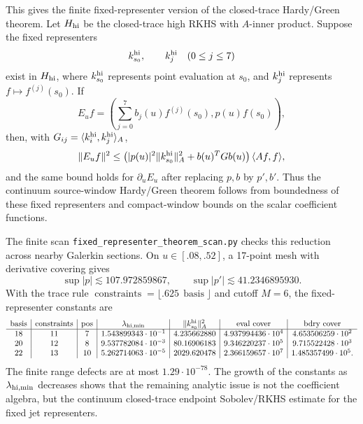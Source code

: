 \documentclass[11pt]{article}
\begin{document}
This gives the finite fixed-representer version of the closed-trace
Hardy/Green theorem.  Let \(H_{\rm hi}\) be the closed-trace high RKHS with
\(A\)-inner product.  Suppose the fixed representers
\[
  k_{s_0}^{\rm hi},\qquad k_j^{\rm hi}\quad(0\le j\le7)
\]
exist in \(H_{\rm hi}\), where \(k_{s_0}^{\rm hi}\) represents point
evaluation at \(s_0\), and \(k_j^{\rm hi}\) represents
\(f\mapsto f^{(j)}(s_0)\).  If
\[
  E_u f=
  \left(
    \sum_{j=0}^7 b_j(u)f^{(j)}(s_0),
    p(u)f(s_0)
  \right),
\]
then, with \(G_{ij}=\langle k_i^{\rm hi},k_j^{\rm hi}\rangle_A\),
\[
  \|E_u f\|^2
  \le
  \left(|p(u)|^2\|k_{s_0}^{\rm hi}\|_A^2+b(u)^TG b(u)\right)
  \langle Af,f\rangle,
\]
and the same bound holds for \(\partial_uE_u\) after replacing \(p,b\) by
\(p',b'\).  Thus the continuum source-window Hardy/Green theorem follows from
boundedness of these fixed representers and compact-window bounds on the
scalar coefficient functions.

The finite scan \texttt{fixed\_representer\_theorem\_scan.py} checks this
reduction across nearby Galerkin sections.  On \(u\in[.08,.52]\), a 17-point
mesh with derivative covering gives
\[
  \sup |p|\lesssim 107.972859867,\qquad
  \sup |p'|\lesssim 41.2346895930.
\]
With the trace rule
\(\operatorname{constraints}=\lfloor .625\,\operatorname{basis}\rfloor\) and
cutoff \(M=6\), the fixed-representer constants are
\[
\begin{array}{c|c|c|c|c|c|c}
\operatorname{basis}&\operatorname{constraints}&\operatorname{pos}&
\lambda_{\rm hi,min}&\|k_{s_0}^{\rm hi}\|_A^2&
\operatorname{eval\ cover}&\operatorname{bdry\ cover}\\\hline
18&11&7&1.543899343\cdot10^{-1}&4.235662880&
4.937994436\cdot10^4&4.653506259\cdot10^2\\
20&12&8&9.537782084\cdot10^{-3}&80.16906183&
9.346220237\cdot10^5&9.715522428\cdot10^3\\
22&13&10&5.262714063\cdot10^{-5}&2029.620478&
2.366159657\cdot10^7&1.485357499\cdot10^5 .
\end{array}
\]
The finite range defects are at most \(1.29\cdot10^{-78}\).  The growth of the
constants as \(\lambda_{\rm hi,min}\) decreases shows that the remaining
analytic issue is not the coefficient algebra, but the continuum
closed-trace endpoint Sobolev/RKHS estimate for the fixed jet representers.
\end{document}
